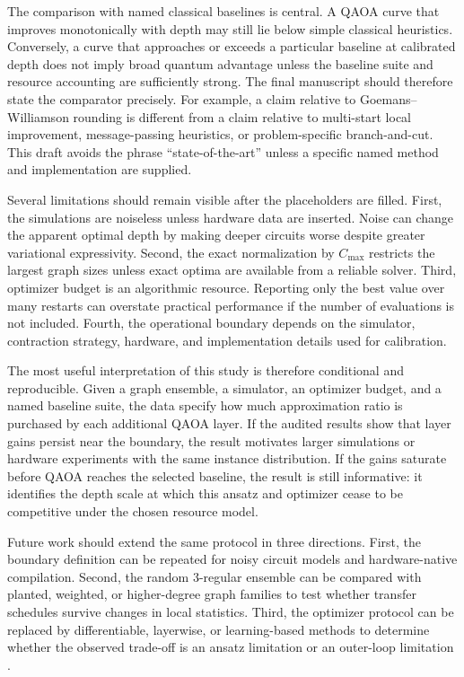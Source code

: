 \documentclass[reprint,aps,longbibliography]{revtex4-2}
\begin{document}
The comparison with named classical baselines is central. A QAOA curve that improves monotonically with depth may still lie below simple classical heuristics. Conversely, a curve that approaches or exceeds a particular baseline at calibrated depth does not imply broad quantum advantage unless the baseline suite and resource accounting are sufficiently strong. The final manuscript should therefore state the comparator precisely. For example, a claim relative to Goemans--Williamson rounding is different from a claim relative to multi-start local improvement, message-passing heuristics, or problem-specific branch-and-cut. This draft avoids the phrase ``state-of-the-art'' unless a specific named method and implementation are supplied.

Several limitations should remain visible after the placeholders are filled. First, the simulations are noiseless unless hardware data are inserted. Noise can change the apparent optimal depth by making deeper circuits worse despite greater variational expressivity. Second, the exact normalization by $C_{\max}$ restricts the largest graph sizes unless exact optima are available from a reliable solver. Third, optimizer budget is an algorithmic resource. Reporting only the best value over many restarts can overstate practical performance if the number of evaluations is not included. Fourth, the operational boundary depends on the simulator, contraction strategy, hardware, and implementation details used for calibration.

The most useful interpretation of this study is therefore conditional and reproducible. Given a graph ensemble, a simulator, an optimizer budget, and a named baseline suite, the data specify how much approximation ratio is purchased by each additional QAOA layer. If the audited results show that layer gains persist near the boundary, the result motivates larger simulations or hardware experiments with the same instance distribution. If the gains saturate before QAOA reaches the selected baseline, the result is still informative: it identifies the depth scale at which this ansatz and optimizer cease to be competitive under the chosen resource model.

Future work should extend the same protocol in three directions. First, the boundary definition can be repeated for noisy circuit models and hardware-native compilation. Second, the random 3-regular ensemble can be compared with planted, weighted, or higher-degree graph families to test whether transfer schedules survive changes in local statistics. Third, the optimizer protocol can be replaced by differentiable, layerwise, or learning-based methods to determine whether the observed trade-off is an ansatz limitation or an outer-loop limitation \cite{Zhou2020QAOAParameters,Wurtz2021QAOATraining,Author2024Optimizer}.
\end{document}
